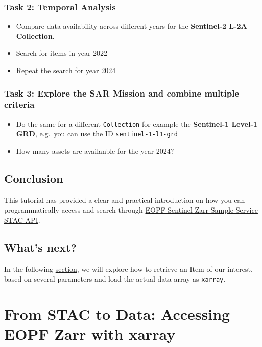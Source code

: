 \documentclass[
  letterpaper,
  DIV=11,
  numbers=noendperiod]{scrreprt}
\providecommand{\tightlist}{%
  \setlength{\itemsep}{0pt}\setlength{\parskip}{0pt}}
\begin{document}
\subsection{Task 2: Temporal Analysis}\label{task-2-temporal-analysis}

\begin{itemize}
\tightlist
\item
  Compare data availability across different years for the
  \textbf{Sentinel-2 L-2A Collection}.
\item
  Search for items in year 2022
\item
  Repeat the search for year 2024
\end{itemize}

\subsection{Task 3: Explore the SAR Mission and combine multiple
criteria}\label{task-3-explore-the-sar-mission-and-combine-multiple-criteria}

\begin{itemize}
\tightlist
\item
  Do the same for a different \texttt{Collection} for example the
  \textbf{Sentinel-1 Level-1 GRD}, e.g.~you can use the ID
  \texttt{sentinel-1-l1-grd}
\item
  How many assets are availanble for the year 2024?
\end{itemize}

\section{Conclusion}\label{conclusion-7}

This tutorial has provided a clear and practical introduction on how you
can programmatically access and search through
\href{https://stac.browser.user.eopf.eodc.eu/?.language=en}{EOPF
Sentinel Zarr Sample Service STAC API}.

\section{What's next?}\label{whats-next-7}

In the following \href{./34_eopf_stac_xarray_tutorial.ipynb}{section},
we will explore how to retrieve an Item of our interest, based on
several parameters and load the actual data array as \texttt{xarray}.

\chapter{From STAC to Data: Accessing EOPF Zarr with
xarray}\label{from-stac-to-data-accessing-eopf-zarr-with-xarray}
\end{document}
